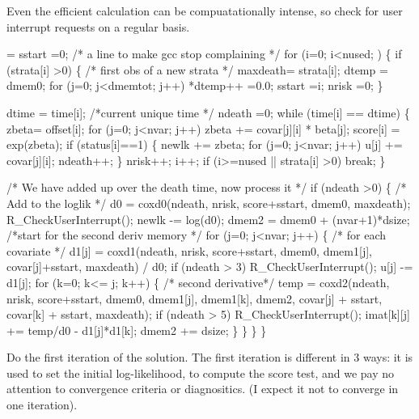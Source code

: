 \documentclass{article}
\begin{document}
Even the efficient calculation can be compuatationally intense, so check for
user interrupt requests on a regular basis.
\begin{nwchunk}
=
 sstart =0;  /* a line to make gcc stop complaining */
 for (i=0; i<nused; ) \{
     if (strata[i] >0) \{ /* first obs of a new strata */
         maxdeath= strata[i];
         dtemp = dmem0;
         for (j=0; j<dmemtot; j++) *dtemp++ =0.0;
         sstart =i;
         nrisk =0;
     \}
     
     dtime = time[i];  /*current unique time */
     ndeath =0;
     while (time[i] == dtime) \{
         zbeta= offset[i];
         for (j=0; j<nvar; j++) zbeta += covar[j][i] * beta[j];
         score[i] = exp(zbeta);
         if (status[i]==1) \{
             newlk += zbeta;
             for (j=0; j<nvar; j++) u[j] += covar[j][i];
             ndeath++;
         \}
         nrisk++;
         i++;
         if (i>=nused || strata[i] >0) break; 
     \}
 
     /* We have added up over the death time, now process it */
     if (ndeath >0) \{ /* Add to the loglik */
         d0 = coxd0(ndeath, nrisk, score+sstart, dmem0, maxdeath);
         R_CheckUserInterrupt();
         newlk -= log(d0);
         dmem2 = dmem0 + (nvar+1)*dsize;  /*start for the second deriv memory */
         for (j=0; j<nvar; j++) \{ /* for each covariate */
             d1[j] = coxd1(ndeath, nrisk, score+sstart, dmem0, dmem1[j], 
                           covar[j]+sstart, maxdeath) / d0;
             if (ndeath > 3) R_CheckUserInterrupt();
             u[j] -= d1[j];
             for (k=0; k<= j; k++) \{  /* second derivative*/
                 temp = coxd2(ndeath, nrisk, score+sstart, dmem0, dmem1[j],
                              dmem1[k], dmem2, covar[j] + sstart, 
                              covar[k] + sstart, maxdeath);
                 if (ndeath > 5) R_CheckUserInterrupt();
                 imat[k][j] += temp/d0 - d1[j]*d1[k];
                 dmem2 += dsize;
             \}
         \}
     \}
  \}
\end{nwchunk}
        
Do the first iteration of the solution.  The first iteration is
different in 3 ways: it is used to set the initial log-likelihood,
to compute the score test, and
we pay no attention to convergence criteria or diagnositics.
(I expect it not to converge in one iteration).
\end{document}
